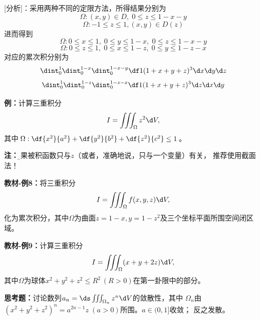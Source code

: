 [分析]：采用两种不同的定限方法，所得结果分别为
$$\Omega:(x,y)\in D,\;0\leq z\leq 1-x-y$$
$$\Omega:-1\leq z\leq 1,(x,y)\in D(z)$$
进而得到
$$\Omega:0\leq x\leq 1,\;0\leq y\leq 1-x,\;0\leq z\leq 1-x-y$$
$$\Omega:0\leq z\leq 1,\;0\leq x\leq 1-z,\;0\leq y\leq 1-z-x$$
对应的累次积分别为
$$\dint_0^1\dint_0^{1-x}\dint_0^{1-x-y}\df1{(1+x+y+z)^3}\d x\d y\d z$$
$$\dint_0^1\dint_0^{1-z}\dint_0^{1-z-x}\df1{(1+x+y+z)^3}\d z\d x\d y$$


{\bf 例：}计算三重积分
$$I=\iiint_{\Omega}z^2\d V,$$
其中$\Omega:\df{x^2}{a^2}+\df{y^2}{b^2}+\df{z^2}{c^2}\leq 1$。

\begin{center}
\end{center}

{\bf 注：}{\b 如果被积函数只与$z$（或者，准确地说，只与一个变量）有关，
推荐使用截面法！}

{\bf 教材-例8：}将三重积分
$$I=\iiint_{\Omega}f(x,y,z)\d V,$$
化为累次积分，其中$\Omega$为曲面$z=1-x,y=1-z^2$及三个坐标平面所围空间闭区域。

{\bf 教材-例9：}计算三重积分
$$I=\iiint_{\Omega}(x+y+2z)\d V,$$
其中$\Omega$为球体$x^2+y^2+z^2\leq R^2\,(R>0)$在第一卦限中的部分。

{\bf 思考题：}讨论数列$a_n=\ds\iiint_{\Omega_n}z^n\d V$的敛散性，其中
$\Omega_n$由$(x^2+y^2+z^2)^n=a^{2n-1}z\;(a>0)$所围。\hfill $a\in(0,1]$收敛；
反之发散。

